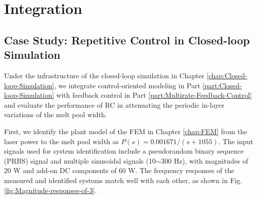 \documentclass [11pt, proquest] {uwthesis}[2020/02/24]
\begin{document}
\part{Integration} \label{part:integration}

\chapter{Case Study: Repetitive Control in Closed-loop Simulation} \label{chap:RC-Closed-loop-Simulation}

Under the infrastructure of the closed-loop simulation in Chapter \ref{chap:Closed-loop-Simulation}, we integrate control-oriented modeling in Part \ref{part:Closed-loop-Simulation} with feedback control in Part \ref{part:Multirate-Feedback-Control} and evaluate
the performance of RC in attenuating the periodic in-layer variations
of the melt pool width.

First, we identify the plant model of the FEM in Chapter \ref{chap:FEM}
from the laser power to the melt pool width as $P(s)=0.001671/(s+1055)$.
The input signals used for system identification include a pseudorandom
binary sequence (PRBS) signal and multiple sinusoidal signals (10$\sim$300
Hz), with magnitudes of 20 W and add-on DC components of 60 W. The
frequency responses of the measured and identified systems match well
with each other, as shown in Fig. \ref{fig:Magnitude-responses-of-3}.
\end{document}
